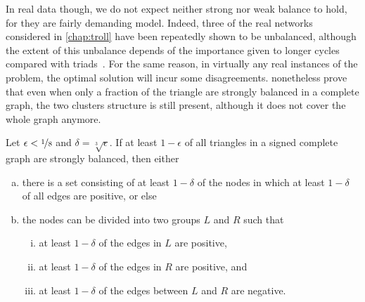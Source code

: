 In real data though, we do not expect neither strong nor weak balance to hold, for they are fairly
demanding model. Indeed, three of the real networks considered in \autoref{chap:troll} have been
repeatedly shown to be unbalanced, although the extent of this unbalance depends of the importance
given to longer cycles compared with triads~\autocites{Facchetti2011isingmodel}{measureUnbalance14}%
{measureUnbalance17}. For the same reason, in virtually any real instances of the \pcc{} problem, the%
optimal solution will incur some disagreements. \Textcite[Section 5.5]{BookKleinberg2010}
nonetheless prove that even when only a fraction of the triangle are strongly balanced in a complete
graph, the two clusters structure is still present, although it does not cover the whole graph
anymore.

\begin{theorem}
  Let $\epsilon < \nicefrac{1}{8}$ and $\delta = \sqrt[3]\epsilon$. If at least $1-\epsilon$ of all
  triangles in a signed complete graph are strongly balanced, then either
  \begin{enumerate}[(a),nosep]
    \item there is a set consisting of at least $1-\delta$ of the nodes in which at least $1-\delta$
      of all edges are positive, or else
    \item the nodes can be divided into two groups $L$ and $R$ such that
      \begin{enumerate}[(i),nosep]
	\item at least $1-\delta$ of the edges in $L$ are positive,
	\item at least $1-\delta$ of the edges in $R$ are positive, and
	\item at least $1-\delta$ of the edges between $L$ and $R$ are negative.
      \end{enumerate}
  \end{enumerate}
\end{theorem}

